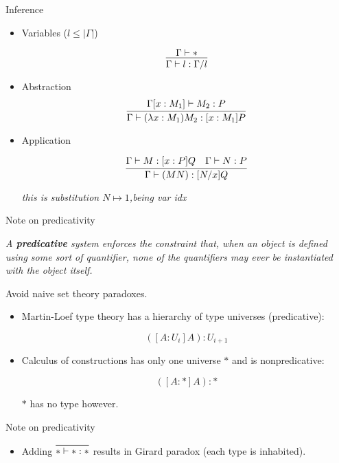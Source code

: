 \documentclass{beamer}
\begin{document}
\begin{frame}{Inference}
\begin{itemize}
\item Variables ($ l \leq | \Gamma | $)

$$\infer{\Gamma \vdash l : \Gamma / l} {\Gamma \vdash *}$$

\item Abstraction
$$\infer{\Gamma \vdash (\lambda x : M_1) M_2 : [x:M_1] P}{\Gamma [x:M_1] \vdash M_2 : P}$$

\item Application

$$\infer{\Gamma \vdash (M N ) : [N/x]Q}{\Gamma \vdash M : [x:P] Q & \Gamma \vdash N:P}$$

\textit{this is substitution $N \mapsto 1$,being var idx}

\end{itemize}
\end{frame}


\begin{frame}{Note on predicativity}

\textit{A \textbf{predicative} system enforces the constraint that, when an object is defined using some sort of quantifier, none of the quantifiers may ever be instantiated with the object itself.} 

Avoid naive set theory paradoxes. 

\begin{itemize}
\pause
\item Martin-Loef type theory has a hierarchy of type universes (predicative):

$$( [A: U_i] A ) : U_{i+1}$$

\pause
\item Calculus of constructions has only one universe $*$ and is nonpredicative:

$$( [A: *] A ) : *$$

$*$ has no type however.

\end{itemize}

\end{frame}



\begin{frame}{Note on predicativity}

\begin{itemize}
\item Adding $\infer{* \vdash * : *}{}$ results in Girard paradox (each type is inhabited).
\end{itemize}

  
\end{frame}
\end{document}
